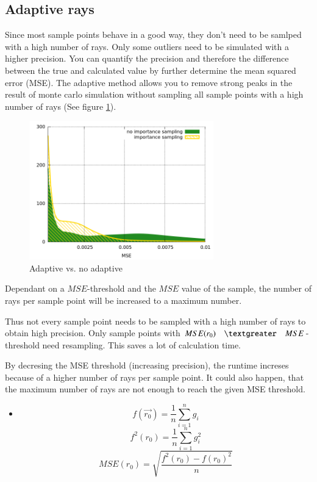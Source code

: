 \subsection{Adaptive rays}
Since most sample points behave in a good way, they don't need
to be samlped with a high number of rays. Only some outliers need to
be simulated with a higher precision. You can quantify the precision
and therefore the difference between the true and calculated value by
further determine the mean squared error (MSE).
The adaptive method allows you to remove strong peaks in the result
of monte carlo simulation without sampling all sample points with
a high number of rays (See figure \ref{plot:adaptive}).
\begin{figure}
  \centering
  \includegraphics[width=8cm]{plot/mse.png}
  \caption{Adaptive vs. no adaptive}
  \label{plot:adaptive}
\end{figure}
Dependant on a $MSE$-threshold and the $MSE$ value
of the sample, the number of rays per sample point 
will be increased to a maximum number.

Thus not every sample point needs to be sampled
with a high number of rays to obtain high precision.
Only sample points with $MSE(r_0) \quad \textgreater \quad MSE$-threshold need
resampling. This saves a lot of calculation time.

By decresing the MSE threshold (increasing precision), the runtime increses because
of a higher number of rays per sample point. It could also happen, that the maximum number
of rays are not enough to reach the given MSE threshold.
\begin{itemize}
\item []
     \[f(\vec{r_0}) = \frac{1}{n} \sum_{i=1}^n g_i \]
     \[f^2(r_0) = \frac{1}{n} \sum_{i=1}^n g_i^2 \]
     \[MSE(r_0) = \sqrt{\frac{f^2(r_0) - f(r_0)^2}{n}}\]
\end{itemize}
